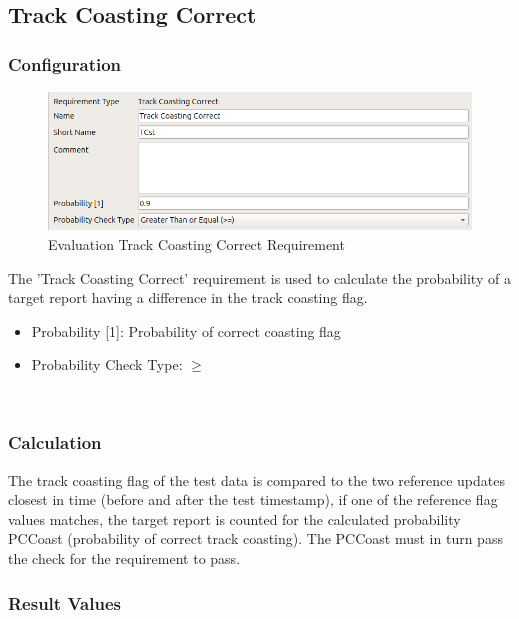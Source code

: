 \subsection{Track Coasting Correct}
\label{sec:eval_req_trk_coast_correct} 

\subsubsection{Configuration}

\begin{figure}[H]
    \includegraphics[width=14cm,frame]{figures/eval_req_coasting.png}
  \caption{Evaluation Track Coasting Correct Requirement}
\end{figure}

The 'Track Coasting Correct’ requirement is used to calculate the probability of a target report having a difference in the track coasting flag. 

\begin{itemize}  
\item Probability [1]: Probability of correct coasting flag
\item Probability Check Type: $\geq$
\end{itemize}
\ \\

\subsubsection{Calculation}

The track coasting flag of the test data is compared to the two reference updates closest in time (before and after the test timestamp), if one of the reference flag values matches, the target report is counted for the calculated probability PCCoast (probability of correct track coasting). The PCCoast must in turn pass the check for the requirement to pass. 

\subsubsection{Result Values}

